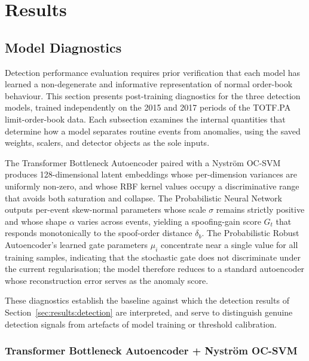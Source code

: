 \documentclass[11pt]{report}
\begin{document}
\chapter{Results}\label{chap:results}

\section{Model Diagnostics}\label{sec:results:diagnostics}

Detection performance evaluation requires prior verification that each model has learned a non-degenerate and informative representation of normal order-book behaviour. This section presents post-training diagnostics for the three detection models, trained independently on the 2015 and 2017 periods of the TOTF.PA limit-order-book data. Each subsection examines the internal quantities that determine how a model separates routine events from anomalies, using the saved weights, scalers, and detector objects as the sole inputs.

The Transformer Bottleneck Autoencoder paired with a Nystr\"om OC-SVM produces 128-dimensional latent embeddings whose per-dimension variances are uniformly non-zero, and whose RBF kernel values occupy a discriminative range that avoids both saturation and collapse. The Probabilistic Neural Network outputs per-event skew-normal parameters whose scale $\sigma$ remains strictly positive and whose shape $\alpha$ varies across events, yielding a spoofing-gain score $G_t$ that responds monotonically to the spoof-order distance $\delta_b$. The Probabilistic Robust Autoencoder's learned gate parameters $\mu_i$ concentrate near a single value for all training samples, indicating that the stochastic gate does not discriminate under the current regularisation; the model therefore reduces to a standard autoencoder whose reconstruction error serves as the anomaly score.

These diagnostics establish the baseline against which the detection results of Section~\ref{sec:results:detection} are interpreted, and serve to distinguish genuine detection signals from artefacts of model training or threshold calibration.

\subsection{Transformer Bottleneck Autoencoder + Nystr\"om OC-SVM}\label{sec:results:diag:tae}
\end{document}
